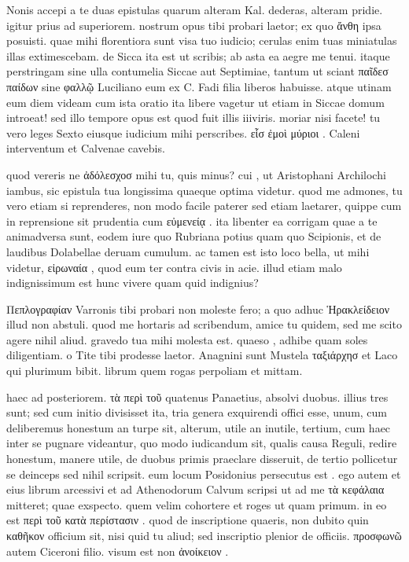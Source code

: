 


 Nonis accepi a te duas epistulas quarum alteram Kal. dederas, alteram pridie. igitur prius ad superiorem. nostrum opus tibi probari laetor; ex quo ἄνθη ipsa posuisti. quae mihi florentiora sunt visa tuo iudicio; cerulas enim tuas miniatulas illas extimescebam. de Sicca ita est ut scribis; ab asta ea aegre me tenui. itaque perstringam sine ulla contumelia Siccae aut Septimiae, tantum ut sciant παῖδεσ παίδων sine φαλλῷ Luciliano eum ex C. Fadi filia liberos habuisse. atque utinam eum diem videam cum ista oratio ita libere vagetur ut etiam in Siccae domum introeat! sed illo tempore opus est quod fuit illis iiiviris. moriar nisi facete! tu vero leges Sexto eiusque iudicium mihi perscribes. εἷσ ἐμοὶ μύριοι . Caleni interventum et Calvenae cavebis.

 quod vereris ne ἀδόλεσχοσ mihi tu, quis minus? cui , ut Aristophani Archilochi iambus, sic epistula tua longissima quaeque optima videtur. quod me admones, tu vero etiam si reprenderes, non modo facile paterer sed etiam laetarer, quippe cum in reprensione sit prudentia cum εὐμενείᾳ . ita libenter ea corrigam quae a te animadversa sunt, eodem iure quo Rubriana potius quam quo Scipionis, et de laudibus Dolabellae deruam cumulum. ac tamen est isto loco bella, ut mihi videtur, εἰρωναία , quod eum ter contra civis in acie. illud etiam malo indignissimum est hunc vivere quam quid indignius?

 Πεπλογραφίαν Varronis tibi probari non moleste fero; a quo adhuc Ἡρακλείδειον illud non abstuli. quod me hortaris ad scribendum, amice tu quidem, sed me scito agere nihil aliud. gravedo tua mihi molesta est. quaeso , adhibe quam soles diligentiam. o Tite tibi prodesse laetor. Anagnini sunt Mustela ταξιάρχησ et Laco qui plurimum bibit. librum quem rogas perpoliam et mittam.

 haec ad posteriorem. τὰ περὶ τοῦ quatenus Panaetius, absolvi duobus. illius tres sunt; sed cum initio divisisset ita, tria genera exquirendi offici esse, unum, cum deliberemus honestum an turpe sit, alterum, utile an inutile, tertium, cum haec inter se pugnare videantur, quo modo iudicandum sit, qualis causa Reguli, redire honestum, manere utile, de duobus primis praeclare disseruit, de tertio pollicetur se deinceps sed nihil scripsit. eum locum Posidonius persecutus est . ego autem et eius librum arcessivi et ad Athenodorum Calvum scripsi ut ad me τὰ κεφάλαια mitteret; quae exspecto. quem velim cohortere et roges ut quam primum. in eo est περὶ τοῦ κατὰ περίστασιν . quod de inscriptione quaeris, non dubito quin καθῆκον officium sit, nisi quid tu aliud; sed inscriptio plenior de officiis. προσφωνῶ autem Ciceroni filio. visum est non ἀνοίκειον .

